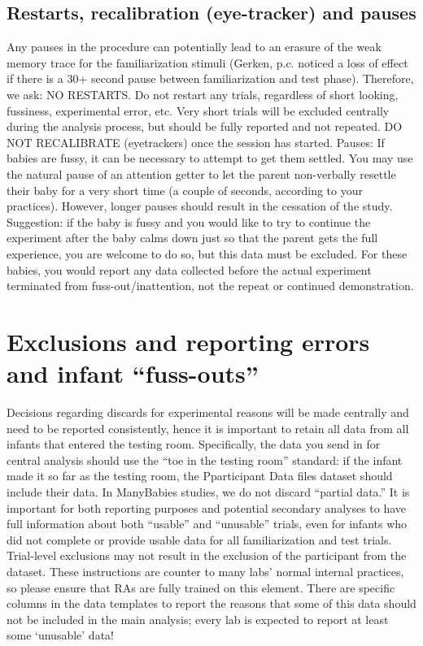\documentclass[
]{book}
\begin{document}
\subsection{Restarts, recalibration (eye-tracker) and pauses}\label{restarts-recalibration-eye-tracker-and-pauses}

Any pauses in the procedure can potentially lead to an erasure of the weak memory trace for the familiarization stimuli (Gerken, p.c. noticed a loss of effect if there is a 30+ second pause between familiarization and test phase). Therefore, we ask:
NO RESTARTS. Do not restart any trials, regardless of short looking, fussiness, experimental error, etc. Very short trials will be excluded centrally during the analysis process, but should be fully reported and not repeated.
DO NOT RECALIBRATE (eyetrackers) once the session has started.
Pauses: If babies are fussy, it can be necessary to attempt to get them settled. You may use the natural pause of an attention getter to let the parent non-verbally resettle their baby for a very short time (a couple of seconds, according to your practices). However, longer pauses should result in the cessation of the study.
Suggestion: if the baby is fussy and you would like to try to continue the experiment after the baby calms down just so that the parent gets the full experience, you are welcome to do so, but this data must be excluded. For these babies, you would report any data collected before the actual experiment terminated from fuss-out/inattention, not the repeat or continued demonstration.

\section{Exclusions and reporting errors and infant ``fuss-outs''}\label{exclusions-and-reporting-errors-and-infant-fuss-outs}

Decisions regarding discards for experimental reasons will be made centrally and need to be reported consistently, hence it is important to retain all data from all infants that entered the testing room. Specifically, the data you send in for central analysis should use the ``toe in the testing room'' standard: if the infant made it so far as the testing room, the Pparticipant Data files dataset should include their data.
In ManyBabies studies, we do not discard ``partial data.'' It is important for both reporting purposes and potential secondary analyses to have full information about both ``usable'' and ``unusable'' trials, even for infants who did not complete or provide usable data for all familiarization and test trials. Trial-level exclusions may not result in the exclusion of the participant from the dataset.
These instructions are counter to many labs' normal internal practices, so please ensure that RAs are fully trained on this element. There are specific columns in the data templates to report the reasons that some of this data should not be included in the main analysis; every lab is expected to report at least some `unusable' data!
\end{document}
